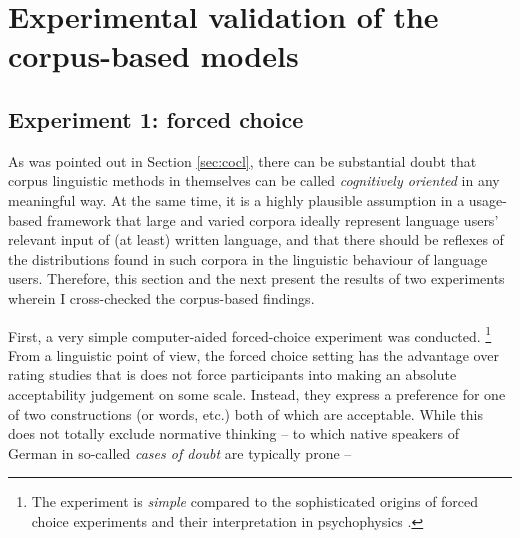 \documentclass[USenglish]{article}
\begin{document}








\section{Experimental validation of the corpus-based models}
\label{sec:externalvalidation}

\subsection{Experiment 1: forced choice}

%

As was pointed out in Section \ref{sec:cocl}, there can be substantial doubt that corpus linguistic methods in themselves can be called \textit{cognitively oriented} in any meaningful way.
At the same time, it is a highly plausible assumption in a usage-based framework that large and varied corpora ideally represent language users' relevant input of (at least) written language, and that there should be reflexes of the distributions found in such corpora in the linguistic behaviour of language users.
Therefore, this section and the next present the results of two experiments wherein I cross-checked the corpus-based findings.

First, a very simple computer-aided forced-choice experiment was conducted.%
\footnote{The experiment is \textit{simple} compared to the sophisticated origins of forced choice experiments and their interpretation in psychophysics \citep[166--179]{MacmillanCreelman2005}.}
From a linguistic point of view, the forced choice setting has the advantage over rating studies that is does not force participants into making an absolute acceptability judgement on some scale.
Instead, they express a preference for one of two constructions (or words, etc.) both of which are acceptable.
While this does not totally exclude normative thinking -- to which native speakers of German in so-called \textit{cases of doubt} are typically prone -- 
\end{document}
